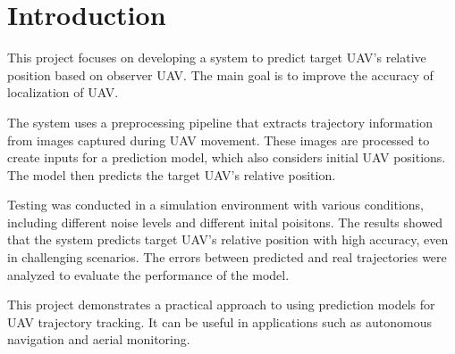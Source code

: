 \chapter{Introduction}

This project focuses on developing a system to predict target UAV's relative position based on observer UAV. The main goal is to improve the accuracy of localization of UAV.

The system uses a preprocessing pipeline that extracts trajectory information from images captured during UAV movement. These images are processed to create inputs for a prediction model, which also considers  initial UAV positions. The model then predicts the target UAV's relative position.

Testing was conducted in a simulation environment with various conditions, including different noise levels and different inital poisitons. The results showed that the system predicts target UAV's relative position with high accuracy, even in challenging scenarios. The errors between predicted and real trajectories were analyzed to evaluate the performance of the model.

This project demonstrates a practical approach to using prediction models for UAV trajectory tracking. It can be useful in applications such as autonomous navigation and aerial monitoring.

